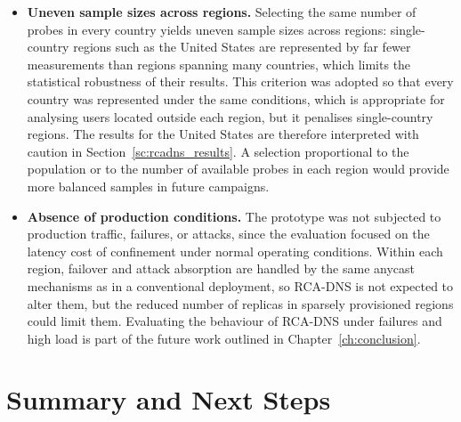 \begin{itemize}
    \item \textbf{Uneven sample sizes across regions.} Selecting the same number of probes in every country yields uneven sample sizes across regions: single-country regions such as the United States are represented by far fewer measurements than regions spanning many countries, which limits the statistical robustness of their results. This criterion was adopted so that every country was represented under the same conditions, which is appropriate for analysing users located outside each region, but it penalises single-country regions. The results for the United States are therefore interpreted with caution in Section~\ref{sc:rcadns_results}. A selection proportional to the population or to the number of available probes in each region would provide more balanced samples in future campaigns.

    \item \textbf{Absence of production conditions.} The prototype was not subjected to production traffic, failures, or attacks, since the evaluation focused on the latency cost of confinement under normal operating conditions. Within each region, failover and attack absorption are handled by the same anycast mechanisms as in a conventional deployment, so RCA-DNS is not expected to alter them, but the reduced number of replicas in sparsely provisioned regions could limit them. Evaluating the behaviour of RCA-DNS under failures and high load is part of the future work outlined in Chapter~\ref{ch:conclusion}.
\end{itemize}

\section{Summary and Next Steps}
\label{sc:rcadns_summary}

